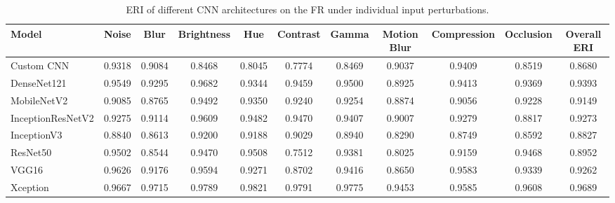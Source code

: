 \documentclass[a4paper,fleqn]{cas-dc}
\begin{document}
\begin{table}[t]
\centering
\caption{ERI of different CNN architectures on the FR under individual input perturbations.}
\label{tab:eri_perturbation_flowers_recognition}

\scriptsize
\setlength{\tabcolsep}{4pt}
\renewcommand{\arraystretch}{1.1}

\begin{tabular}{|l|ccccccccc|c|}
\hline
\textbf{Model} &
\textbf{Noise} &
\textbf{Blur} &
\textbf{Brightness} &
\textbf{Hue} &
\textbf{Contrast} &
\textbf{Gamma} &
\textbf{Motion Blur} &
\textbf{Compression} &
\textbf{Occlusion} &
\textbf{Overall ERI} \\
\hline

Custom CNN
&0.9318&0.9084&0.8468&0.8045&0.7774&0.8469&0.9037&0.9409&0.8519&0.8680\\

DenseNet121
&0.9549&0.9295&0.9682&0.9344&0.9459&0.9500&0.8925&0.9413&0.9369&0.9393\\

MobileNetV2
&0.9085&0.8765&0.9492&0.9350&0.9240&0.9254&0.8874&0.9056&0.9228&0.9149\\

InceptionResNetV2
&0.9275&0.9114&0.9609&0.9482&0.9470&0.9407&0.9007&0.9279&0.8817&0.9273\\

InceptionV3
&0.8840&0.8613&0.9200&0.9188&0.9029&0.8940&0.8290&0.8749&0.8592&0.8827\\

ResNet50
&0.9502&0.8544&0.9470&0.9508&0.7512&0.9381&0.8025&0.9159&0.9468&0.8952\\

VGG16
&0.9626&0.9176&0.9594&0.9271&0.8702&0.9416&0.8650&0.9583&0.9339&0.9262\\

Xception
&0.9667&0.9715&0.9789&0.9821&0.9791&0.9775&0.9453&0.9585&0.9608&0.9689\\

\hline
\end{tabular}
\end{table}
\end{document}
